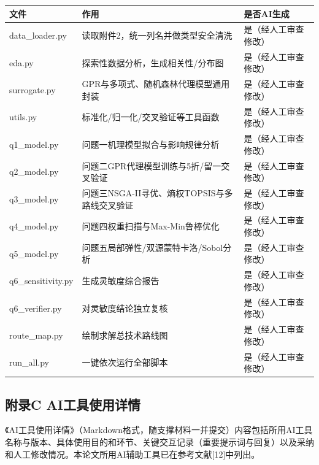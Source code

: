 \documentclass[withoutpreface]{cumcmthesis}
\begin{document}
\begin{table}[htbp]
\centering
\small
\begin{tabularx}{\textwidth}{XXX}
\toprule
文件 & 作用 & 是否AI生成 \\
\midrule
data\_loader.py & 读取附件2，统一列名并做类型安全清洗 & 是（经人工审查修改） \\
eda.py & 探索性数据分析，生成相关性/分布图 & 是（经人工审查修改） \\
surrogate.py & GPR与多项式、随机森林代理模型通用封装 & 是（经人工审查修改） \\
utils.py & 标准化/归一化/交叉验证等工具函数 & 是（经人工审查修改） \\
q1\_model.py & 问题一机理模型拟合与影响规律分析 & 是（经人工审查修改） \\
q2\_model.py & 问题二GPR代理模型训练与5折/留一交叉验证 & 是（经人工审查修改） \\
q3\_model.py & 问题三NSGA-II寻优、熵权TOPSIS与多路线交叉验证 & 是（经人工审查修改） \\
q4\_model.py & 问题四权重扫描与Max-Min鲁棒优化 & 是（经人工审查修改） \\
q5\_model.py & 问题五局部弹性/双源蒙特卡洛/Sobol分析 & 是（经人工审查修改） \\
q6\_sensitivity.py & 生成灵敏度综合报告 & 是（经人工审查修改） \\
q6\_verifier.py & 对灵敏度结论独立复核 & 是（经人工审查修改） \\
route\_map.py & 绘制求解总技术路线图 & 是（经人工审查修改） \\
run\_all.py & 一键依次运行全部脚本 & 是（经人工审查修改） \\
\bottomrule
\end{tabularx}
\end{table}
\subsection{附录C AI工具使用详情}
《AI工具使用详情》（Markdown格式，随支撑材料一并提交）内容包括所用AI工具名称与版本、具体使用目的和环节、关键交互记录（重要提示词与回复）以及采纳和人工修改情况。本论文所用AI辅助工具已在参考文献[12]中列出。
\end{document}

